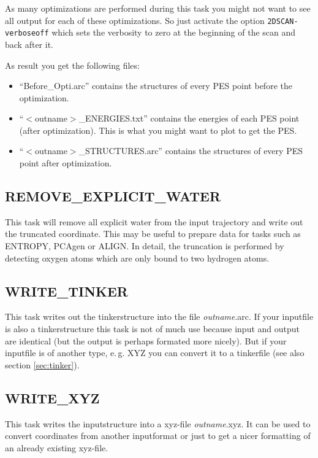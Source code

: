 \documentclass[10pt,a4paper]{article} %
\begin{document}
As many optimizations are performed during this task you might not want to see all output for each of these optimizations. So just activate the option \texttt{2DSCAN-verboseoff} which sets the verbosity to zero at the beginning of the scan and back after it.

As result you get the following files:
\begin{itemize}
	\item ``Before\_Opti.arc'' contains the structures of every PES point before the optimization.
	\item ``$<$outname$>$\_ENERGIES.txt'' contains the energies of each PES point (after optimization). This is what you might want to plot to get the PES.
	\item ``$<$outname$>$\_STRUCTURES.arc'' contains the structures of every PES point after optimization.
\end{itemize}
	
	\subsection{REMOVE\_EXPLICIT\_WATER}	
	This task will remove all explicit water from the input trajectory and write out the truncated coordinate. This may be useful to prepare data for tasks such as ENTROPY, PCAgen or ALIGN. In detail, the truncation is performed by detecting oxygen atoms which are only bound to two hydrogen atoms.\\
	
	\subsection{WRITE\_TINKER}
	This task writes out the tinkerstructure into the file \textit{outname}.arc. If your inputfile is also a tinkerstructure this task is not of much use because input and output are identical (but the output is perhaps formated more nicely). But if your inputfile is of another type, e.\,g. XYZ you can convert it to a tinkerfile (see also section \ref{sec:tinker}).
	
	\subsection{WRITE\_XYZ}
	This task writes the inputstructure into a xyz-file \textit{outname}.xyz. It can be used to convert coordinates from another inputformat or just to get a nicer formatting of an already existing xyz-file.
	
\end{document}
